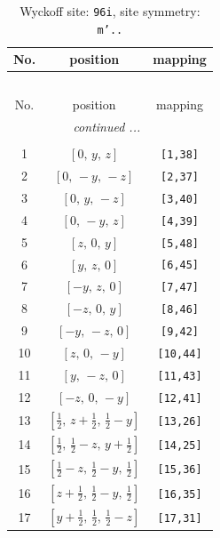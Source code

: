 \documentclass[fleqn,8pt]{jsarticle}
\begin{document}
\begin{longtable}{ccc}
\caption{Wyckoff site: {\tt 96i}, site symmetry: {\tt m'..}}
 \\
 \hline \hline
No. & position & mapping \\ \hline \endfirsthead

\multicolumn{2}{l}{\tablename\ \thetable{}} \\
 \hline \hline
No. & position & mapping \\ \hline \endhead

 \hline \hline
\multicolumn{2}{r}{\footnotesize\it continued ...} \\ \endfoot

 \hline \hline
\multicolumn{2}{r}{} \\ \endlastfoot

1 & $\left[ 0,\, y,\, z \right]$ & {\tt [1,38]} \\ \hline
2 & $\left[ 0,\, - y,\, - z \right]$ & {\tt [2,37]} \\ \hline
3 & $\left[ 0,\, y,\, - z \right]$ & {\tt [3,40]} \\ \hline
4 & $\left[ 0,\, - y,\, z \right]$ & {\tt [4,39]} \\ \hline
5 & $\left[ z,\, 0,\, y \right]$ & {\tt [5,48]} \\ \hline
6 & $\left[ y,\, z,\, 0 \right]$ & {\tt [6,45]} \\ \hline
7 & $\left[ - y,\, z,\, 0 \right]$ & {\tt [7,47]} \\ \hline
8 & $\left[ - z,\, 0,\, y \right]$ & {\tt [8,46]} \\ \hline
9 & $\left[ - y,\, - z,\, 0 \right]$ & {\tt [9,42]} \\ \hline
10 & $\left[ z,\, 0,\, - y \right]$ & {\tt [10,44]} \\ \hline
11 & $\left[ y,\, - z,\, 0 \right]$ & {\tt [11,43]} \\ \hline
12 & $\left[ - z,\, 0,\, - y \right]$ & {\tt [12,41]} \\ \hline
13 & $\left[ \frac{1}{2},\, z + \frac{1}{2},\, \frac{1}{2} - y \right]$ & {\tt [13,26]} \\ \hline
14 & $\left[ \frac{1}{2},\, \frac{1}{2} - z,\, y + \frac{1}{2} \right]$ & {\tt [14,25]} \\ \hline
15 & $\left[ \frac{1}{2} - z,\, \frac{1}{2} - y,\, \frac{1}{2} \right]$ & {\tt [15,36]} \\ \hline
16 & $\left[ z + \frac{1}{2},\, \frac{1}{2} - y,\, \frac{1}{2} \right]$ & {\tt [16,35]} \\ \hline
17 & $\left[ y + \frac{1}{2},\, \frac{1}{2},\, \frac{1}{2} - z \right]$ & {\tt [17,31]} \\ \hline

\end{longtable}
\end{document}
